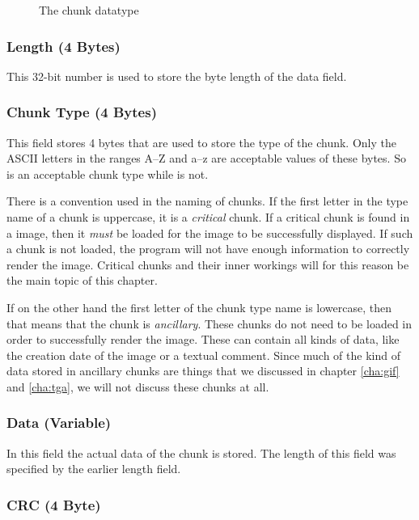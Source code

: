 \begin{figure}
  \centering
  \caption{The \png chunk datatype}
  \label{fig:png-chunk}
\end{figure}

\subsubsection*{Length (4 Bytes)}

This 32-bit number is used to store the byte length of the data
field.

\subsubsection*{Chunk Type (4 Bytes)}

This field stores 4 bytes that are used to store the type of the
chunk. Only the ASCII letters in the ranges A--Z and a--z are
acceptable values of these bytes. So  is an acceptable
chunk type while  is not.

There is a convention used in the naming of chunks. If the first
letter in the type name of a chunk is uppercase, it is a
\textit{critical} chunk. If a critical chunk is found in a \png image,
then it \textit{must} be loaded for the image to be successfully
displayed.  If such a chunk is not loaded, the program will not have
enough information to correctly render the image. Critical chunks and
their inner workings will for this reason be the main topic of this
chapter.

If on the other hand the first letter of the chunk type name is
lowercase, then that means that the chunk is \textit{ancillary}. These
chunks do not need to be loaded in order to successfully render the
image. These can contain all kinds of data, like the creation date of
the image or a textual comment. Since much of the kind of data stored
in ancillary chunks are things that we discussed in chapter
\ref{cha:gif} and \ref{cha:tga}, we will not discuss these chunks at
all.

\subsubsection*{Data (Variable)}

In this field the actual data of the chunk is stored. The length of
this field was specified by the earlier length field.

\subsubsection*{CRC (4 Byte)}

